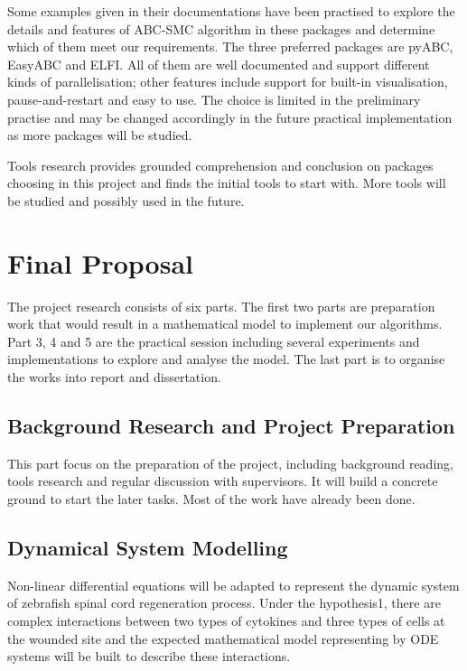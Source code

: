 \documentclass{article}
\begin{document}
Some examples given in their documentations have been practised to explore the details and features of ABC-SMC algorithm in these packages and determine which of them meet our requirements. The three preferred packages are pyABC, EasyABC and ELFI. All of them are well documented and support different kinds of parallelisation; other features include support for built-in visualisation, pause-and-restart and easy to use. The choice is limited in the preliminary practise and may be changed accordingly in the future practical implementation as more packages will be studied.

Tools research provides grounded comprehension and conclusion on packages 
choosing in this project and finds the initial tools to start with. More 
tools will be studied and possibly used in the future.

\section{Final Proposal}

The project research consists of six parts. The first two parts are preparation work that would result in a mathematical model to implement our algorithms. Part 3, 4 and 5 are the practical session including several experiments and implementations to explore and analyse the model. The last part is to organise the works into report and dissertation.

\subsection{Background Research and Project Preparation}

This part focus on the preparation of the project, including background reading, tools research and regular discussion with supervisors. It will build a concrete ground to start the later tasks. Most of the work have already been done.

\subsection{Dynamical System Modelling}

Non-linear differential equations will be adapted to represent the dynamic system of zebrafish spinal cord regeneration process. Under the hypothesis1, there are complex interactions between two types of cytokines and three types of cells at the wounded site and the expected mathematical model representing by ODE systems will be built to describe these interactions.
\end{document}
